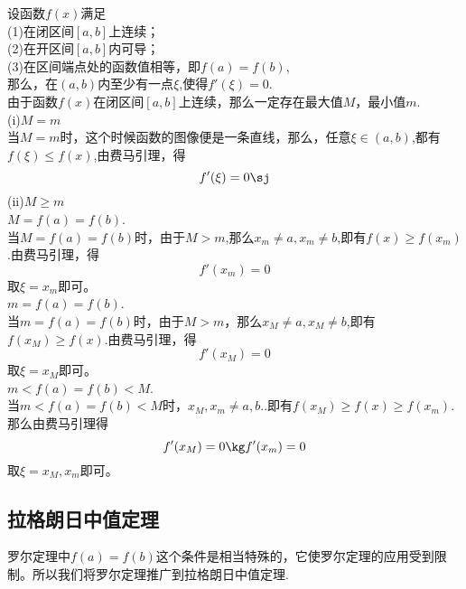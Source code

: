 \sj
\theorem[罗尔(Rolle)定理]
\noindent 设函数$f(x)$满足\\
\kg(1)\enspace 在闭区间$[a,b]$上连续；\\
\kg(2)\enspace 在开区间$[a,b]$内可导；\\
\kg(3)\enspace 在区间端点处的函数值相等，即$f(a)=f(b)$,\\
那么，在$(a,b)$内至少有一点$\xi $,使得$f'(\xi)=0$.\vspace{0.5em}\\
\proof 由于函数$f(x)$在闭区间$[a,b]$上连续，那么一定存在最大值$M$，最小值$m$.
\\ (i)\enspace $M=m$\\
\kg 当$M=m$时，这个时候函数的图像便是一条直线，那么，任意$\xi \in(a,b)$,都有$f(\xi)\leq f(x)$,由费马引理，得
\begin{equation}
\nonumber
f'(\xi)=0\sj
\end{equation}
(ii)\enspace$M\geq m $\\
 $M=f(a)=f(b)$.\\
\kg 当$M=f(a)=f(b)$时，由于$M>m$,那么$x_m\neq a,x_m\neq b$,即有$f(x)\geq f(x_m)$.由费马引理，得
\begin{equation}
	\nonumber
	f'(x_m)=0
\end{equation}
取$\xi=x_m$即可。\\
 $m=f(a)=f(b)$.\\
\kg 当$m=f(a)=f(b)$时，由于$M>m$，那么$x_M\neq a,x_M\neq b$,即有$f(x_M)\geq f(x)$.由费马引理，得
\begin{equation}
	f'(x_M)=0
\end{equation}
取$\xi=x_M$即可。\\
 $m<f(a)=f(b)<M$.\\
\kg 当$m<f(a)=f(b)<M时$，$x_M,x_m\neq a,b.$.即有$f(x_M)\geq f(x)\geq f(x_m)$.那么由费马引理得
\begin{equation}
	f'(x_M)=0\kg f'(x_m)=0
\end{equation}
取$\xi=x_M,x_m$即可。
\subsection{拉格朗日中值定理}
罗尔定理中$f(a)=f(b)$这个条件是相当特殊的，它使罗尔定理的应用受到限制。所以我们将罗尔定理推广到拉格朗日中值定理.\\

